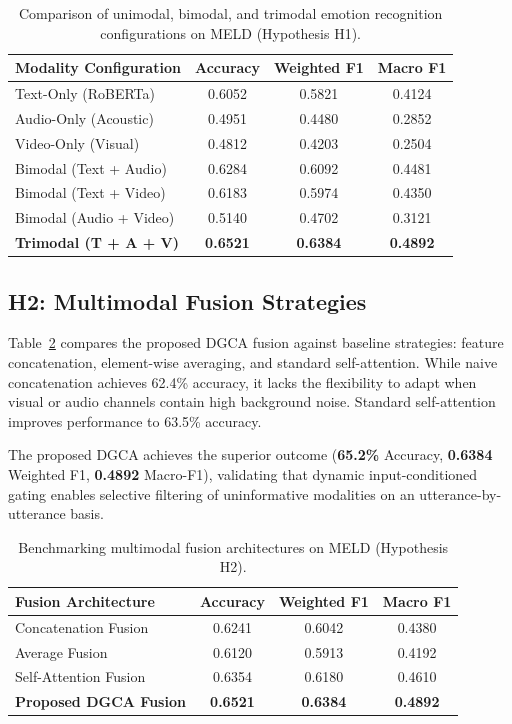 \documentclass[10pt,twocolumn,letterpaper]{article}
\begin{document}
\begin{table}[htbp]
\centering
\small
\caption{Comparison of unimodal, bimodal, and trimodal emotion recognition configurations on MELD (Hypothesis H1).}
\label{tab:multimodal_h1}
\begin{tabular}{lccc}
\toprule
\textbf{Modality Configuration} & \textbf{Accuracy} & \textbf{Weighted F1} & \textbf{Macro F1} \\
\midrule
Text-Only (RoBERTa)       & 0.6052 & 0.5821 & 0.4124 \\
Audio-Only (Acoustic)     & 0.4951 & 0.4480 & 0.2852 \\
Video-Only (Visual)       & 0.4812 & 0.4203 & 0.2504 \\
\midrule
Bimodal (Text + Audio)    & 0.6284 & 0.6092 & 0.4481 \\
Bimodal (Text + Video)    & 0.6183 & 0.5974 & 0.4350 \\
Bimodal (Audio + Video)   & 0.5140 & 0.4702 & 0.3121 \\
\midrule
\textbf{Trimodal (T + A + V)} & \textbf{0.6521} & \textbf{0.6384} & \textbf{0.4892} \\
\bottomrule
\end{tabular}
\end{table}

\subsection{H2: Multimodal Fusion Strategies}
Table~\ref{tab:fusion_h2} compares the proposed DGCA fusion against baseline strategies: feature concatenation, element-wise averaging, and standard self-attention. While naive concatenation achieves 62.4\% accuracy, it lacks the flexibility to adapt when visual or audio channels contain high background noise. Standard self-attention improves performance to 63.5\% accuracy. 

The proposed DGCA achieves the superior outcome (\textbf{65.2\%} Accuracy, \textbf{0.6384} Weighted F1, \textbf{0.4892} Macro-F1), validating that dynamic input-conditioned gating enables selective filtering of uninformative modalities on an utterance-by-utterance basis.

\begin{table}[htbp]
\centering
\small
\caption{Benchmarking multimodal fusion architectures on MELD (Hypothesis H2).}
\label{tab:fusion_h2}
\begin{tabular}{lccc}
\toprule
\textbf{Fusion Architecture} & \textbf{Accuracy} & \textbf{Weighted F1} & \textbf{Macro F1} \\
\midrule
Concatenation Fusion        & 0.6241 & 0.6042 & 0.4380 \\
Average Fusion              & 0.6120 & 0.5913 & 0.4192 \\
Self-Attention Fusion       & 0.6354 & 0.6180 & 0.4610 \\
\midrule
\textbf{Proposed DGCA Fusion} & \textbf{0.6521} & \textbf{0.6384} & \textbf{0.4892} \\
\bottomrule
\end{tabular}
\end{table}
\end{document}
